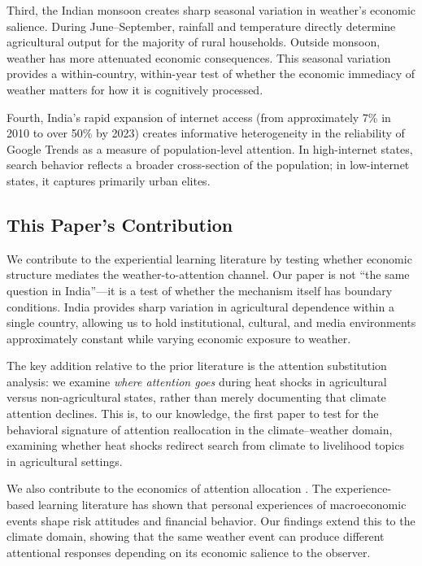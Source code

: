 \documentclass[12pt]{article}
\begin{document}
Third, the Indian monsoon creates sharp seasonal variation in weather's economic salience. During June--September, rainfall and temperature directly determine agricultural output for the majority of rural households. Outside monsoon, weather has more attenuated economic consequences. This seasonal variation provides a within-country, within-year test of whether the economic immediacy of weather matters for how it is cognitively processed.

Fourth, India's rapid expansion of internet access (from approximately 7\% in 2010 to over 50\% by 2023) creates informative heterogeneity in the reliability of Google Trends as a measure of population-level attention. In high-internet states, search behavior reflects a broader cross-section of the population; in low-internet states, it captures primarily urban elites.

\subsection{This Paper's Contribution}

We contribute to the experiential learning literature by testing whether economic structure mediates the weather-to-attention channel. Our paper is not ``the same question in India''---it is a test of whether the mechanism itself has boundary conditions. India provides sharp variation in agricultural dependence within a single country, allowing us to hold institutional, cultural, and media environments approximately constant while varying economic exposure to weather.

The key addition relative to the prior literature is the attention substitution analysis: we examine \textit{where attention goes} during heat shocks in agricultural versus non-agricultural states, rather than merely documenting that climate attention declines. This is, to our knowledge, the first paper to test for the behavioral signature of attention reallocation in the climate--weather domain, examining whether heat shocks redirect search from climate to livelihood topics in agricultural settings.

We also contribute to the economics of attention allocation \citep{sims2003rational, bordalo2012salience}. The experience-based learning literature \citep{malmendier2011depression, choi2009reinforcement} has shown that personal experiences of macroeconomic events shape risk attitudes and financial behavior. Our findings extend this to the climate domain, showing that the same weather event can produce different attentional responses depending on its economic salience to the observer.
\end{document}
